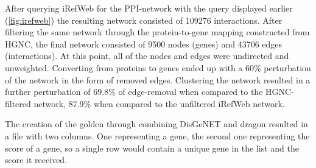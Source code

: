 After querying iRefWeb for the PPI-network with the query displayed earlier
(\ref{fig:irefweb}) the resulting network consisted of 109276 interactions.
After filtering the same network through the protein-to-gene mapping constructed
from HGNC, the final network consisted of 9500 nodes (genes) and 43706 edges
(interactions). At this point, all of the nodes and edges were undirected and
unweighted. Converting from proteins to genes ended up with a 60\% perturbation
of the network in the form of removed edges. Clustering the network resulted in
a further perturbation of 69.8\% of edge-removal when compared to the
HGNC-filtered network, 87.9\% when compared to the unfiltered iRefWeb network.

The creation of the \gls{golden} through combining DisGeNET and \gls{dragon}
resulted in a file with two columns. One representing a gene, the second one
representing the score of a gene, so a single row would contain a unique gene in
the list and the score it received.


